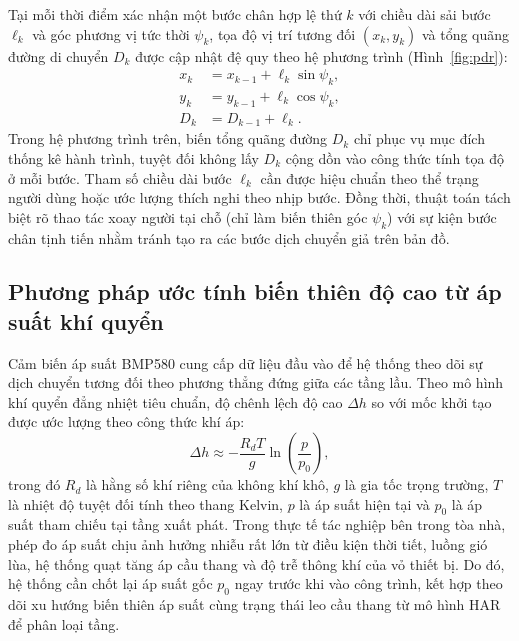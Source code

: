 Tại mỗi thời điểm xác nhận một bước chân hợp lệ thứ $k$ với chiều dài sải bước $\ell_k$ và góc phương vị tức thời $\psi_k$, tọa độ vị trí tương đối $(x_k, y_k)$ và tổng quãng đường di chuyển $D_k$ được cập nhật đệ quy theo hệ phương trình (Hình~\ref{fig:pdr}):
\begin{align}
x_k&=x_{k-1}+\ell_k\sin\psi_k,\\
y_k&=y_{k-1}+\ell_k\cos\psi_k,\\
D_k&=D_{k-1}+\ell_k.
\end{align}
Trong hệ phương trình trên, biến tổng quãng đường $D_k$ chỉ phục vụ mục đích thống kê hành trình, tuyệt đối không lấy $D_k$ cộng dồn vào công thức tính tọa độ ở mỗi bước. Tham số chiều dài bước $\ell_k$ cần được hiệu chuẩn theo thể trạng người dùng hoặc ước lượng thích nghi theo nhịp bước. Đồng thời, thuật toán tách biệt rõ thao tác xoay người tại chỗ (chỉ làm biến thiên góc $\psi_k$) với sự kiện bước chân tịnh tiến nhằm tránh tạo ra các bước dịch chuyển giả trên bản đồ.


\subsection{Phương pháp ước tính biến thiên độ cao từ áp suất khí quyển}
Cảm biến áp suất BMP580 cung cấp dữ liệu đầu vào để hệ thống theo dõi sự dịch chuyển tương đối theo phương thẳng đứng giữa các tầng lầu. Theo mô hình khí quyển đẳng nhiệt tiêu chuẩn, độ chênh lệch độ cao $\Delta h$ so với mốc khởi tạo được ước lượng theo công thức khí áp:
\begin{equation}
\Delta h\approx-\frac{R_dT}{g}\ln\!\left(\frac{p}{p_0}\right),
\end{equation}
trong đó $R_d$ là hằng số khí riêng của không khí khô, $g$ là gia tốc trọng trường, $T$ là nhiệt độ tuyệt đối tính theo thang Kelvin, $p$ là áp suất hiện tại và $p_0$ là áp suất tham chiếu tại tầng xuất phát. Trong thực tế tác nghiệp bên trong tòa nhà, phép đo áp suất chịu ảnh hưởng nhiễu rất lớn từ điều kiện thời tiết, luồng gió lùa, hệ thống quạt tăng áp cầu thang và độ trễ thông khí của vỏ thiết bị. Do đó, hệ thống cần chốt lại áp suất gốc $p_0$ ngay trước khi vào công trình, kết hợp theo dõi xu hướng biến thiên áp suất cùng trạng thái leo cầu thang từ mô hình HAR để phân loại tầng.

